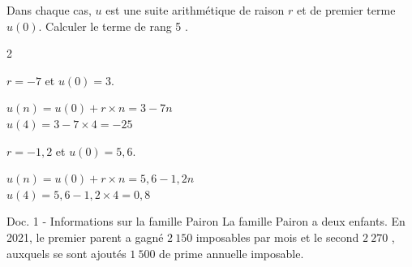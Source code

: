 \documentclass[11pt,a4paper]{article}  %
\begin{document}
Dans chaque cas, $u$ est une suite arithmétique de raison $r$ et de premier terme $u(0)$. Calculer le terme de rang 5 .
\begin{multicols}{2}
	\begin{enumMet}
		\item $r=-7$ et $u(0)=3$.
		\begin{corrBox}
			$u(n)=u(0)+r\times n=3-7n$\\
			$u(4)=3-7\times 4=-25$	
		\end{corrBox}
		\columnbreak
		\item $r=-1,2$ et $u(0)=5,6$.
		\begin{corrBox}
			$u(n)=u(0)+r\times n=5,6-1,2n$\\
			$u(4)=5,6-1,2\times 4=0,8$	
		\end{corrBox}
	\end{enumMet}
\end{multicols}


\begin{consequences}{Doc. 1 - Informations sur la famille Pairon}
	La famille Pairon a deux enfants.
	En 2021, le premier parent a gagné $2\ 150$ \EUR{} imposables par mois et le second $2\ 270$ \EUR{}, auxquels se sont ajoutés $1\ 500$ \EUR{} de prime annuelle imposable.
\end{consequences}
\ \\
\end{document}
